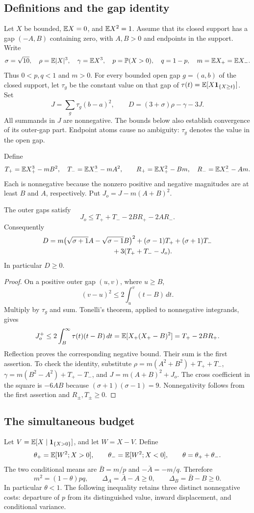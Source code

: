 \subsection{Definitions and the gap identity}
Let $X$ be bounded, $\mathbb E X=0$, and $\mathbb E X^2=1$. Assume that its closed
support has a gap $(-A,B)$ containing zero, with $A,B>0$ and endpoints in
the support. Write
\[
 \sigma=\sqrt{10},\quad \rho=\mathbb E|X|^3,\quad \gamma=\mathbb E X^3,
 \quad p=\mathbb P(X>0),\quad q=1-p,\quad m=\mathbb E X_+=\mathbb E X_-.
\]
Thus $0<p,q<1$ and $m>0$. For every bounded open gap $g=(a,b)$ of the
closed support, let $\tau_g$ be the constant value on that gap of
$\tau(t)=\mathbb E[X\mathbf1_{\{X\ge t\}}]$. Set
\[
 J=\sum_g\tau_g(b-a)^2,
 \qquad D=(3+\sigma)\rho-\gamma-3J.
\]
All summands in $J$ are nonnegative. The bounds below also establish
convergence of its outer-gap part. Endpoint atoms cause no ambiguity:
$\tau_g$ denotes the value in the open gap.

Define
\[
 T_+=\mathbb E X_+^3-mB^2,\quad T_-=\mathbb E X_-^3-mA^2,
 \qquad R_+=\mathbb E X_+^2-Bm,\quad R_-=\mathbb E X_-^2-Am.
\]
Each is nonnegative because the nonzero positive and negative magnitudes
are at least $B$ and $A$, respectively. Put $J_o=J-m(A+B)^2$.

\begin{lemma}\label{lem:gap}
The outer gaps satisfy
\[
 J_o\le T_++T_--2BR_+-2AR_-.
\]
Consequently
\begin{align}
 D={}&m\bigl(\sqrt{\sigma+1}A-\sqrt{\sigma-1}B\bigr)^2
 +(\sigma-1)T_++(\sigma+1)T_-\notag\\
 &\hspace{28mm}+3(T_++T_--J_o).\label{eq:exact}
\end{align}
In particular $D\ge0$.
\end{lemma}
\begin{proof}
On a positive outer gap $(u,v)$, where $u\ge B$,
\[
 (v-u)^2\le 2\int_u^v(t-B)\,dt.
\]
Multiply by $\tau_g$ and sum. Tonelli's theorem, applied to nonnegative
integrands, gives
\[
 J_o^+\le2\int_B^\infty\tau(t)(t-B)\,dt
 =\mathbb E[X_+(X_+-B)^2]=T_+-2BR_+.
\]
Reflection proves the corresponding negative bound. Their sum is the
first assertion. To check the identity, substitute
$\rho=m(A^2+B^2)+T_++T_-$,
$\gamma=m(B^2-A^2)+T_+-T_-$, and
$J=m(A+B)^2+J_o$. The cross coefficient in the square is $-6AB$
because $(\sigma+1)(\sigma-1)=9$. Nonnegativity follows from the first
assertion and $R_\pm,T_\pm\ge0$.
\end{proof}

\subsection{The simultaneous budget}
Let $V=\mathbb E[X\mid\mathbf1_{\{X>0\}}]$, and let $W=X-V$. Define
\[
 \theta_+=\mathbb E[W^2;X>0],\qquad
 \theta_-=\mathbb E[W^2;X<0],\qquad \theta=\theta_++\theta_-.
\]
The two conditional means are $\bar B=m/p$ and $-\bar A=-m/q$.
Therefore
\[
 m^2=(1-\theta)pq,\qquad
 \Delta_A=\bar A-A\ge0,\qquad\Delta_B=\bar B-B\ge0.
\]
In particular $\theta<1$. The following inequality retains three distinct
nonnegative costs: departure of $p$ from its distinguished value,
inward displacement, and conditional variance.


